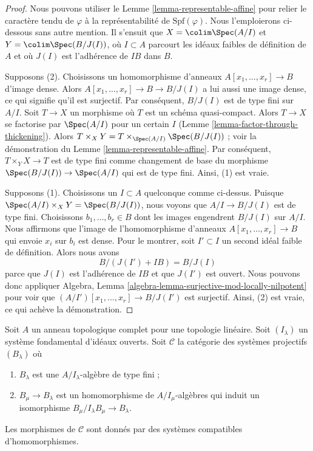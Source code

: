 \begin{proof}
Nous pouvons utiliser le Lemme \ref{lemma-representable-affine} pour relier le caractère tendu de
$\varphi$ à la représentabilité de $\text{Spf}(\varphi)$. Nous l'emploierons
ci-dessous sans autre mention. Il s'ensuit que $X = \colim \Spec(A/I)$
et $Y = \colim \Spec(B/J(I))$, où $I \subset A$ parcourt les idéaux faibles
de définition de $A$ et où $J(I)$ est l'adhérence de $IB$ dans $B$.

\medskip\noindent
Supposons (2).
Choisissons un homomorphisme d'anneaux $A[x_1, \ldots, x_r] \to B$ d'image dense.
Alors $A[x_1, \ldots, x_r] \to B \to B/J(I)$ a lui aussi une image dense,
ce qui signifie qu'il est surjectif. Par conséquent, $B/J(I)$ est de
type fini sur $A/I$. Soit $T \to X$ un morphisme où
$T$ est un schéma quasi-compact. Alors $T \to X$ se factorise par
$\Spec(A/I)$ pour un certain $I$ (Lemme \ref{lemma-factor-through-thickening}).
Alors $T \times_X Y = T \times_{\Spec(A/I)} \Spec(B/J(I))$ ; voir la démonstration du
Lemme \ref{lemma-representable-affine}.
Par conséquent, $T \times_Y X \to T$ est de type fini comme changement de base du
morphisme $\Spec(B/J(I)) \to \Spec(A/I)$ qui est de type
fini. Ainsi, (1) est vraie.

\medskip\noindent
Supposons (1). Choisissons un $I \subset A$ quelconque comme ci-dessus. Puisque
$\Spec(A/I) \times_X Y = \Spec(B/J(I))$, nous voyons que $A/I \to B/J(I)$
est de type fini. Choisissons $b_1, \ldots, b_r \in B$
dont les images engendrent $B/J(I)$ sur $A/I$. Nous affirmons que l'image
de l'homomorphisme d'anneaux $A[x_1, \ldots, x_r] \to B$ qui envoie $x_i$ sur $b_i$
est dense. Pour le montrer, soit $I' \subset I$ un second idéal faible
de définition. Alors nous avons
$$
B/(J(I') + IB) = B/J(I)
$$
parce que $J(I)$ est l'adhérence de $IB$ et que $J(I')$ est ouvert.
Nous pouvons donc appliquer Algebra, Lemma
\ref{algebra-lemma-surjective-mod-locally-nilpotent}
pour voir que $(A/I')[x_1, \ldots, x_r] \to B/J(I')$ est surjectif.
Ainsi, (2) est vraie, ce qui achève la démonstration.
\end{proof}

\noindent
Soit $A$ un anneau topologique complet pour une topologie
linéaire. Soit $(I_\lambda)$ un système fondamental d'idéaux ouverts.
Soit $\mathcal{C}$ la catégorie des systèmes projectifs $(B_\lambda)$ où
\begin{enumerate}
\item $B_\lambda$ est une $A/I_\lambda$-algèbre de type fini ;
\item $B_\mu \to B_\lambda$ est un homomorphisme de $A/I_\mu$-algèbres
qui induit un isomorphisme $B_\mu/I_\lambda B_\mu \to B_\lambda$.
\end{enumerate}
Les morphismes de $\mathcal{C}$ sont donnés par des systèmes compatibles d'homomorphismes.

